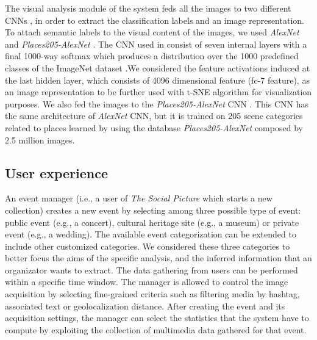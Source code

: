 The visual analysis module of the system feds all the images to two different CNNs \cite{krizhevsky2012imagenet, zhou2014learning}, in order to extract the classification labels and an image representation. To attach semantic labels to the visual content of the images, we used \textit{AlexNet} \cite{krizhevsky2012imagenet} and \textit{Places205-AlexNet} \cite{zhou2014learning}.
The CNN used in \cite{krizhevsky2012imagenet} consist of seven internal layers with a final 1000-way softmax which produces a distribution over the 1000 predefined classes of the ImageNet dataset \cite{ILSVRC15}.We considered the feature activations induced at the last hidden layer, which consists of 4096 dimensional feature (fc-7 feature), as an image representation to be further used with t-SNE algorithm \cite{van2008visualizing} for visualization purposes. 
We also fed the images to the \textit{Places205-AlexNet} CNN \cite{zhou2014learning}. This CNN has the same architecture of \textit{AlexNet} CNN, but it is trained on 205 scene categories related to places learned by using the database \textit{Places205-AlexNet} composed by 2.5 million images.

\subsection{User experience}
An event manager (i.e., a user of \textit{The Social Picture} which starts a new collection) creates a new event by selecting among three possible type of event: public event (e.g., a concert), cultural heritage site (e.g., a museum) or private event (e.g., a wedding). The available event categorization can be extended to include other customized categories. We considered these three categories to better focus the aims of the specific analysis, and the inferred information that an organizator wants to extract.
The data gathering from users can be performed within a specific time window. The manager is allowed to control the image acquisition by selecting fine-grained criteria such as filtering media by hashtag, associated text or geolocalization distance.
After creating the event and its acquisition settings, the manager can select the statistics that the system have to compute by exploiting the collection of multimedia data gathered for that event.

